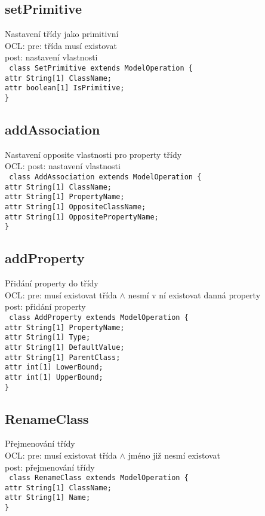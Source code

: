 \documentclass[11pt,a4paper]{article}
\begin{document}
	\subsection{setPrimitive}
	Nastavení třídy jako primitivní \\
	OCL: pre: třída musí existovat \\
	post: nastavení vlastnosti \\
	\texttt{
    class SetPrimitive extends ModelOperation \{\\
      attr String[1] ClassName;\\
      attr boolean[1] IsPrimitive;\\
    \}
	}
	\subsection{addAssociation}
	Nastavení opposite vlastnosti pro property třídy \\
	OCL: post: nastavení vlastnosti \\
	\texttt{
    class AddAssociation extends ModelOperation \{\\
      attr String[1] ClassName;\\
      attr String[1] PropertyName;\\
      attr String[1] OppositeClassName;\\
      attr String[1] OppositePropertyName;\\
    \}
	}
	\subsection{addProperty}
	Přidání property do třídy \\
	OCL: pre: musí existovat třída $\wedge$ nesmí v ní existovat danná property \\	
	post: přidání property \\
	\texttt{
    class AddProperty extends ModelOperation \{\\
      attr String[1] PropertyName;\\
      attr String[1] Type;\\
      attr String[1] DefaultValue;\\
      attr String[1] ParentClass;\\
      attr int[1] LowerBound;\\
      attr int[1] UpperBound;\\
    \}
	}	
	\subsection{RenameClass}
	Přejmenování třídy \\
	OCL: pre: musí existovat třída	$\wedge$ jméno již nesmí existovat \\
	post: přejmenování třídy \\
	\texttt{
     class RenameClass extends ModelOperation \{ \\
      attr String[1] ClassName;\\
      attr String[1] Name;\\
    \}
	}
\end{document}
